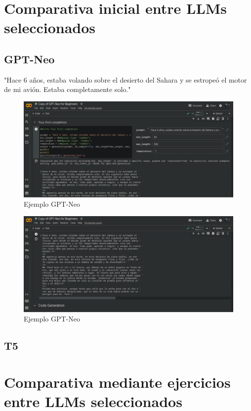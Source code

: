 \documentclass[journal,onecolumn]{IEEEtran}
\begin{document}
	\section{Comparativa inicial entre LLMs seleccionados}
	\subsection{GPT-Neo}
	"Hace 6 años, estaba volando sobre el desierto del Sahara y se estropeó el motor de mi avión. Estaba completamente solo."
	\begin{figure}[h]
	\centering
	\includegraphics[scale=0.5]{gptneo_1}
	\caption{Ejemplo GPT-Neo}
	\small
\end{figure}
	\begin{figure}[h]
	\centering
	\includegraphics[scale=0.5]{gptneo_2}
	\caption{Ejemplo GPT-Neo}
	\small
\end{figure}
	\subsection{T5}
	\section{Comparativa mediante ejercicios entre LLMs seleccionados }
\end{document}
